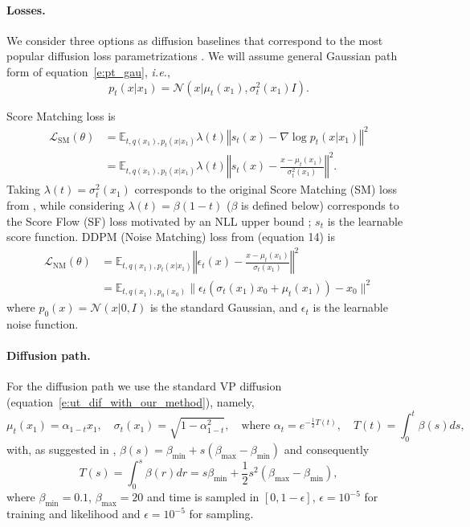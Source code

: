 \documentclass{article}
\makeatletter
\newcommand{\norm}[1]{\left\Vert#1\right\Vert}
\newcommand{\eps}{\varepsilon}
\newcommand{\SM}{\scriptscriptstyle \text{SM}}
\newcommand{\NM}{\scriptscriptstyle \text{NM}}
\newcommand{\ie}{{i.e.}}
\def\eqref#1{equation~\ref{#1}}
\def\eps{{\epsilon}}
\def\gL{{\mathcal{L}}}
\def\gN{{\mathcal{N}}}
\newcommand{\E}{\mathbb{E}}
\renewcommand*{\ie}{{\it i.e.}\@\xspace}
\makeatother
\begin{document}
{
\paragraph{Losses.}
We consider three options as diffusion baselines that correspond to the most popular diffusion loss parametrizations \citep{song2019score,song2021maximum,ho2020denoising,kingma2021vdm}. We will assume general Gaussian path form of \eqref{e:pt_gau}, \ie, 
\begin{equation*}
    p_t(x|x_1)=\gN(x|\mu_t(x_1),\sigma_t^2(x_1) I).
\end{equation*}

Score Matching loss is 
\begin{align}
    \gL_{\SM}(\theta) &= \E_{t,q(x_1),p_t(x|x_1)} \lambda(t) \norm{s_t(x) - \nabla \log p_t(x|x_1)}^2 \\
    &= \E_{t,q(x_1),p_t(x|x_1)} \lambda(t) \norm{s_t(x) - \frac{x-\mu_t(x_1)}{\sigma_t^2(x_1)}}^2.
\end{align}
Taking $\lambda(t) = \sigma_t^{2}(x_1)$ corresponds to the original Score Matching (SM) loss from \cite{song2019score}, while considering $\lambda(t)=\beta(1-t)$ ($\beta$ is defined below) corresponds to the Score Flow (SF) loss motivated by an NLL upper bound \citep{song2021maximum}; $s_t$ is the learnable score function. DDPM (Noise Matching) loss from \cite{ho2020denoising} (equation 14) is
\begin{align}
    \gL_{\NM}(\theta)  &= \E_{t,q(x_1),p_t(x|x_1)}  \norm{\epsilon_t(x) - \frac{x-\mu_t(x_1)}{\sigma_t(x_1)} }^2 \\
    &= 
    \E_{t,q(x_1),p_0(x_0)} \Big \|  {\epsilon_t(\sigma_t(x_1) x_0 + \mu_t(x_1)) - x_0 }\Big \|^2
\end{align}
where $p_0(x)=\gN(x|0,I)$ is the standard Gaussian, and $\epsilon_t$ is the learnable noise function.

\paragraph{Diffusion path.} For the diffusion path we use the standard VP diffusion (\eqref{e:ut_dif_with_our_method}), namely,
\begin{equation*}
    \mu_t(x_1) = \alpha_{1-t}x_1, \quad \sigma_t(x_1) = \sqrt{1-\alpha_{1-t}^2},\quad  \text{where } \alpha_t = e^{-\frac{1}{2}T(t)},\quad  T(t)=\int_0^{t} \beta(s)ds,
\end{equation*}
with, as suggested in \cite{song2020score}, $\beta(s) = \beta_{\min} + s(\beta_{\max}-\beta_{\min})$ and consequently 
$$T(s) = \int_0^s \beta(r)dr = s\beta_{\min} + \frac{1}{2}s^2(\beta_{\max} - \beta_{\min}),$$
where $\beta_{\min}=0.1$, $\beta_{\max}=20$ and time is sampled in $[0,1-\eps]$, $\eps=10^{-5}$ for training and likelihood and $\eps=10^{-5}$ for sampling.

}
\end{document}
